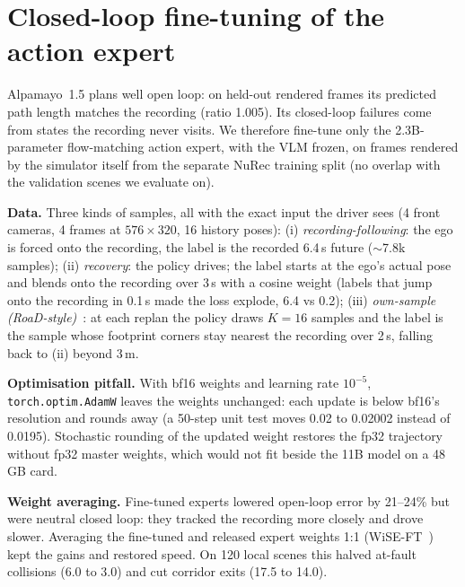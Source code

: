 
\section{Closed-loop fine-tuning of the action expert}
Alpamayo~1.5 plans well open loop: on held-out rendered frames its predicted path length matches the recording
(ratio 1.005). Its closed-loop failures come from states the recording never visits. We therefore fine-tune only
the 2.3B-parameter flow-matching action expert, with the VLM frozen, on frames rendered by the simulator itself
from the separate NuRec training split (no overlap with the validation scenes we evaluate on).

\textbf{Data.} Three kinds of samples, all with the exact input the driver sees (4 front cameras, 4 frames at
$576\times320$, 16 history poses):
(i) \emph{recording-following}: the ego is forced onto the recording, the label is the recorded 6.4\,s future
($\sim$7.8k samples);
(ii) \emph{recovery}: the policy drives; the label starts at the ego's actual pose and blends onto the recording
over 3\,s with a cosine weight (labels that jump onto the recording in 0.1\,s made the loss explode, 6.4 vs 0.2);
(iii) \emph{own-sample (RoaD-style)}~\cite{road}: at each replan the policy draws $K{=}16$ samples and the label
is the sample whose footprint corners stay nearest the recording over 2\,s, falling back to (ii) beyond 3\,m.

\textbf{Optimisation pitfall.} With bf16 weights and learning rate $10^{-5}$, \texttt{torch.optim.AdamW} leaves
the weights unchanged: each update is below bf16's resolution and rounds away (a 50-step unit test moves 0.02 to
0.02002 instead of 0.0195). Stochastic rounding of the updated weight restores the fp32 trajectory without fp32
master weights, which would not fit beside the 11B model on a 48\,GB card.

\textbf{Weight averaging.} Fine-tuned experts lowered open-loop error by 21--24\% but were neutral closed loop:
they tracked the recording more closely and drove slower. Averaging the fine-tuned and released expert weights
1:1 (WiSE-FT~\cite{wiseft}) kept the gains and restored speed. On 120 local scenes this halved at-fault collisions
(6.0 to 3.0) and cut corridor exits (17.5 to 14.0). 

